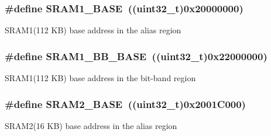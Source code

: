 \subsubsection[{\texorpdfstring{S\+R\+A\+M1\+\_\+\+B\+A\+SE}{SRAM1_BASE}}]{\setlength{\rightskip}{0pt plus 5cm}\#define S\+R\+A\+M1\+\_\+\+B\+A\+SE~((uint32\+\_\+t)0x20000000)}\hypertarget{group___peripheral__memory__map_ga7d0fbfb8894012dbbb96754b95e562cd}{}\label{group___peripheral__memory__map_ga7d0fbfb8894012dbbb96754b95e562cd}
S\+R\+A\+M1(112 K\+B) base address in the alias region 
\subsubsection[{\texorpdfstring{S\+R\+A\+M1\+\_\+\+B\+B\+\_\+\+B\+A\+SE}{SRAM1_BB_BASE}}]{\setlength{\rightskip}{0pt plus 5cm}\#define S\+R\+A\+M1\+\_\+\+B\+B\+\_\+\+B\+A\+SE~((uint32\+\_\+t)0x22000000)}\hypertarget{group___peripheral__memory__map_gac4c4f61082e4b168f29d9cf97dc3ca5c}{}\label{group___peripheral__memory__map_gac4c4f61082e4b168f29d9cf97dc3ca5c}
S\+R\+A\+M1(112 K\+B) base address in the bit-\/band region 
\subsubsection[{\texorpdfstring{S\+R\+A\+M2\+\_\+\+B\+A\+SE}{SRAM2_BASE}}]{\setlength{\rightskip}{0pt plus 5cm}\#define S\+R\+A\+M2\+\_\+\+B\+A\+SE~((uint32\+\_\+t)0x2001\+C000)}\hypertarget{group___peripheral__memory__map_gadbb42a3d0a8a90a79d2146e4014241b1}{}\label{group___peripheral__memory__map_gadbb42a3d0a8a90a79d2146e4014241b1}
S\+R\+A\+M2(16 K\+B) base address in the alias region 
